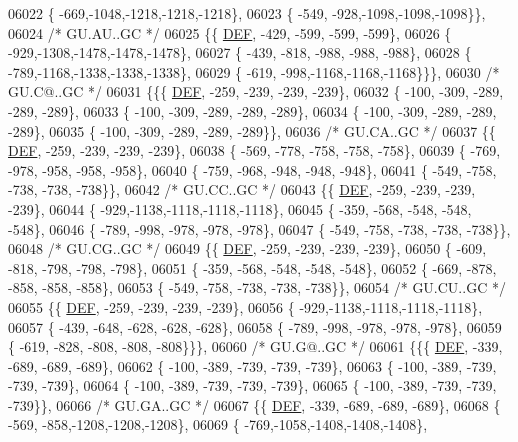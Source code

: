 \begin{DoxyCode}
06022 \{ -669,-1048,-1218,-1218,-1218\},
06023 \{ -549, -928,-1098,-1098,-1098\}\},
06024 \textcolor{comment}{/* GU.AU..GC */}
06025 \{\{  \mbox{\hyperlink{1_88_84__epars_8h_a397419fc12b37ed479c8abb9d444d843}{DEF}}, -429, -599, -599, -599\},
06026 \{ -929,-1308,-1478,-1478,-1478\},
06027 \{ -439, -818, -988, -988, -988\},
06028 \{ -789,-1168,-1338,-1338,-1338\},
06029 \{ -619, -998,-1168,-1168,-1168\}\}\},
06030 \textcolor{comment}{/* GU.C@..GC */}
06031 \{\{\{  \mbox{\hyperlink{1_88_84__epars_8h_a397419fc12b37ed479c8abb9d444d843}{DEF}}, -259, -239, -239, -239\},
06032 \{ -100, -309, -289, -289, -289\},
06033 \{ -100, -309, -289, -289, -289\},
06034 \{ -100, -309, -289, -289, -289\},
06035 \{ -100, -309, -289, -289, -289\}\},
06036 \textcolor{comment}{/* GU.CA..GC */}
06037 \{\{  \mbox{\hyperlink{1_88_84__epars_8h_a397419fc12b37ed479c8abb9d444d843}{DEF}}, -259, -239, -239, -239\},
06038 \{ -569, -778, -758, -758, -758\},
06039 \{ -769, -978, -958, -958, -958\},
06040 \{ -759, -968, -948, -948, -948\},
06041 \{ -549, -758, -738, -738, -738\}\},
06042 \textcolor{comment}{/* GU.CC..GC */}
06043 \{\{  \mbox{\hyperlink{1_88_84__epars_8h_a397419fc12b37ed479c8abb9d444d843}{DEF}}, -259, -239, -239, -239\},
06044 \{ -929,-1138,-1118,-1118,-1118\},
06045 \{ -359, -568, -548, -548, -548\},
06046 \{ -789, -998, -978, -978, -978\},
06047 \{ -549, -758, -738, -738, -738\}\},
06048 \textcolor{comment}{/* GU.CG..GC */}
06049 \{\{  \mbox{\hyperlink{1_88_84__epars_8h_a397419fc12b37ed479c8abb9d444d843}{DEF}}, -259, -239, -239, -239\},
06050 \{ -609, -818, -798, -798, -798\},
06051 \{ -359, -568, -548, -548, -548\},
06052 \{ -669, -878, -858, -858, -858\},
06053 \{ -549, -758, -738, -738, -738\}\},
06054 \textcolor{comment}{/* GU.CU..GC */}
06055 \{\{  \mbox{\hyperlink{1_88_84__epars_8h_a397419fc12b37ed479c8abb9d444d843}{DEF}}, -259, -239, -239, -239\},
06056 \{ -929,-1138,-1118,-1118,-1118\},
06057 \{ -439, -648, -628, -628, -628\},
06058 \{ -789, -998, -978, -978, -978\},
06059 \{ -619, -828, -808, -808, -808\}\}\},
06060 \textcolor{comment}{/* GU.G@..GC */}
06061 \{\{\{  \mbox{\hyperlink{1_88_84__epars_8h_a397419fc12b37ed479c8abb9d444d843}{DEF}}, -339, -689, -689, -689\},
06062 \{ -100, -389, -739, -739, -739\},
06063 \{ -100, -389, -739, -739, -739\},
06064 \{ -100, -389, -739, -739, -739\},
06065 \{ -100, -389, -739, -739, -739\}\},
06066 \textcolor{comment}{/* GU.GA..GC */}
06067 \{\{  \mbox{\hyperlink{1_88_84__epars_8h_a397419fc12b37ed479c8abb9d444d843}{DEF}}, -339, -689, -689, -689\},
06068 \{ -569, -858,-1208,-1208,-1208\},
06069 \{ -769,-1058,-1408,-1408,-1408\},

\end{DoxyCode}

